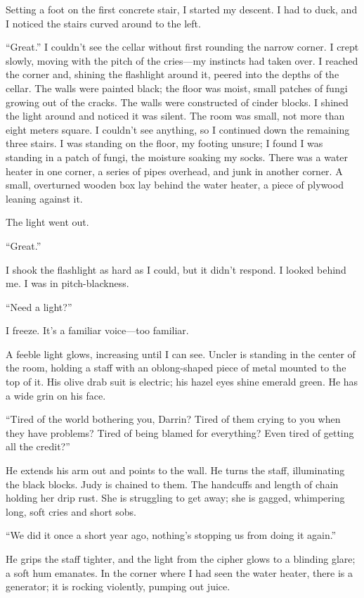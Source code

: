\documentclass[
]{article}
\begin{document}
Setting a foot on the first concrete stair, I started my descent. I had
to duck, and I noticed the stairs curved around to the left.

``Great.'' I couldn't see the cellar without first rounding the narrow
corner. I crept slowly, moving with the pitch of the cries---my
instincts had taken over. I reached the corner and, shining the
flashlight around it, peered into the depths of the cellar. The walls
were painted black; the floor was moist, small patches of fungi growing
out of the cracks. The walls were constructed of cinder blocks. I shined
the light around and noticed it was silent. The room was small, not more
than eight meters square. I couldn't see anything, so I continued down
the remaining three stairs. I was standing on the floor, my footing
unsure; I found I was standing in a patch of fungi, the moisture soaking
my socks. There was a water heater in one corner, a series of pipes
overhead, and junk in another corner. A small, overturned wooden box lay
behind the water heater, a piece of plywood leaning against it.

The light went out.

``Great.''

I shook the flashlight as hard as I could, but it didn't respond. I
looked behind me. I was in pitch-blackness.

``Need a light?''

I freeze. It's a familiar voice---too familiar.

A feeble light glows, increasing until I can see. Uncler is standing in
the center of the room, holding a staff with an oblong-shaped piece of
metal mounted to the top of it. His olive drab suit is electric; his
hazel eyes shine emerald green. He has a wide grin on his face.

``Tired of the world bothering you, Darrin? Tired of them crying to you
when they have problems? Tired of being blamed for everything? Even
tired of getting all the credit?''

He extends his arm out and points to the wall. He turns the staff,
illuminating the black blocks. Judy is chained to them. The handcuffs
and length of chain holding her drip rust. She is struggling to get
away; she is gagged, whimpering long, soft cries and short sobs.

``We did it once a short year ago, nothing's stopping us from doing it
again.''

He grips the staff tighter, and the light from the cipher glows to a
blinding glare; a soft hum emanates. In the corner where I had seen the
water heater, there is a generator; it is rocking violently, pumping out
juice.
\end{document}
